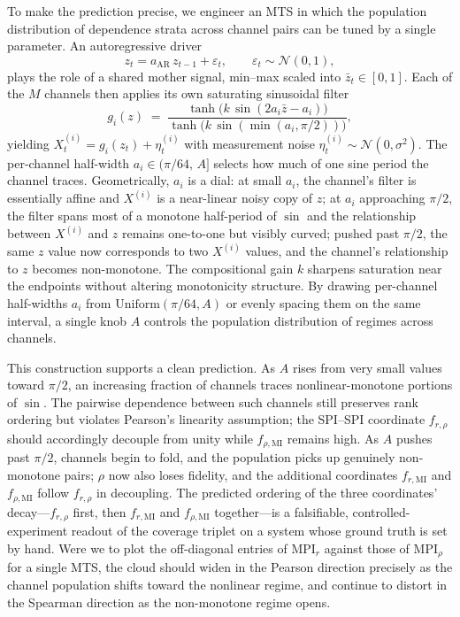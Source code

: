 \documentclass{article}
\theoremstyle{plain}
\theoremstyle{definition}
\theoremstyle{remark}
\begin{document}
To make the prediction precise, we engineer an MTS in which the population distribution of dependence strata across channel pairs can be tuned by a single parameter. An autoregressive driver
\begin{equation}
z_t = a_{\text{AR}}\, z_{t-1} + \varepsilon_t, \qquad \varepsilon_t \sim \mathcal{N}(0,1),
\label{eq:ar1-mother}
\end{equation}
plays the role of a shared mother signal, min--max scaled into $\bar{z}_t \in [0,1]$. Each of the $M$ channels then applies its own saturating sinusoidal filter
\begin{equation}
\label{eq:tanhsin}
g_i(z) \;=\; \frac{\tanh\!\bigl(k\, \sin(2 a_i \bar{z} - a_i)\bigr)}{\tanh\!\bigl(k\, \sin(\min(a_i,\pi/2))\bigr)},
\end{equation}
yielding $X^{(i)}_t = g_i(z_t) + \eta^{(i)}_t$ with measurement noise $\eta^{(i)}_t \sim \mathcal{N}(0,\sigma^2)$. The per-channel half-width $a_i \in (\pi/64,\,A]$ selects how much of one sine period the channel traces. Geometrically, $a_i$ is a dial: at small $a_i$, the channel's filter is essentially affine and $X^{(i)}$ is a near-linear noisy copy of $z$; at $a_i$ approaching $\pi/2$, the filter spans most of a monotone half-period of $\sin$ and the relationship between $X^{(i)}$ and $z$ remains one-to-one but visibly curved; pushed past $\pi/2$, the same $z$ value now corresponds to two $X^{(i)}$ values, and the channel's relationship to $z$ becomes non-monotone. The compositional gain $k$ sharpens saturation near the endpoints without altering monotonicity structure. By drawing per-channel half-widths $a_i$ from $\mathrm{Uniform}(\pi/64, A)$ or evenly spacing them on the same interval, a single knob $A$ controls the population distribution of regimes across channels.

This construction supports a clean prediction. As $A$ rises from very small values toward $\pi/2$, an increasing fraction of channels traces nonlinear-monotone portions of $\sin$. The pairwise dependence between such channels still preserves rank ordering but violates Pearson's linearity assumption; the SPI--SPI coordinate $f_{r,\rho}$ should accordingly decouple from unity while $f_{\rho,\mathrm{MI}}$ remains high. As $A$ pushes past $\pi/2$, channels begin to fold, and the population picks up genuinely non-monotone pairs; $\rho$ now also loses fidelity, and the additional coordinates $f_{r,\mathrm{MI}}$ and $f_{\rho,\mathrm{MI}}$ follow $f_{r,\rho}$ in decoupling. The predicted ordering of the three coordinates' decay---$f_{r,\rho}$ first, then $f_{r,\mathrm{MI}}$ and $f_{\rho,\mathrm{MI}}$ together---is a falsifiable, controlled-experiment readout of the coverage triplet on a system whose ground truth is set by hand. Were we to plot the off-diagonal entries of $\mathrm{MPI}_r$ against those of $\mathrm{MPI}_\rho$ for a single MTS, the cloud should widen in the Pearson direction precisely as the channel population shifts toward the nonlinear regime, and continue to distort in the Spearman direction as the non-monotone regime opens.
\end{document}
